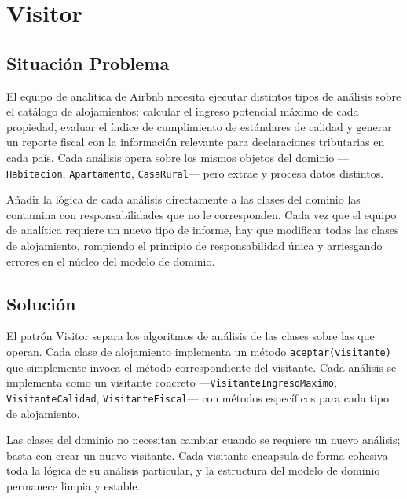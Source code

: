 
\chapter{Visitor}

\section{Situación Problema}

El equipo de analítica de Airbnb necesita ejecutar distintos tipos de
análisis sobre el catálogo de alojamientos: calcular el ingreso
potencial máximo de cada propiedad, evaluar el índice de cumplimiento
de estándares de calidad y generar un reporte fiscal con la información
relevante para declaraciones tributarias en cada país. Cada análisis
opera sobre los mismos objetos del dominio —\texttt{Habitacion},
\texttt{Apartamento}, \texttt{CasaRural}— pero extrae y procesa datos
distintos.

Añadir la lógica de cada análisis directamente a las clases del dominio
las contamina con responsabilidades que no le corresponden. Cada vez que
el equipo de analítica requiere un nuevo tipo de informe, hay que modificar
todas las clases de alojamiento, rompiendo el principio de
responsabilidad única y arriesgando errores en el núcleo del modelo de
dominio.

\section{Solución}

El patrón Visitor separa los algoritmos de análisis de las clases sobre
las que operan. Cada clase de alojamiento implementa un método
\texttt{aceptar(visitante)} que simplemente invoca el método correspondiente
del visitante. Cada análisis se implementa como un visitante concreto
—\texttt{VisitanteIngresoMaximo}, \texttt{VisitanteCalidad},
\texttt{VisitanteFiscal}— con métodos específicos para cada tipo de
alojamiento.

Las clases del dominio no necesitan cambiar cuando se requiere un nuevo
análisis; basta con crear un nuevo visitante. Cada visitante encapsula
de forma cohesiva toda la lógica de su análisis particular, y la
estructura del modelo de dominio permanece limpia y estable.

